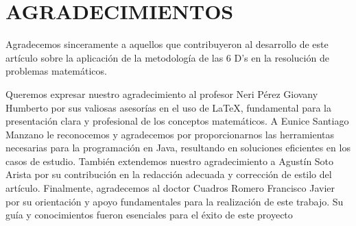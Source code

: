 \documentclass{IEEEcsmag}
\begin{document}
\section{AGRADECIMIENTOS}
Agradecemos sinceramente a aquellos que contribuyeron al desarrollo de este artículo sobre la aplicación de la metodología de las 6 D's en la resolución de problemas matemáticos.

Queremos expresar nuestro agradecimiento al profesor Neri Pérez Giovany Humberto por sus valiosas asesorías en el uso de LaTeX, fundamental para la presentación clara y profesional de los conceptos matemáticos. A Eunice Santiago Manzano le reconocemos y agradecemos por proporcionarnos las herramientas necesarias para la programación en Java, resultando en soluciones eficientes en los casos de estudio. También extendemos nuestro agradecimiento a Agustín Soto Arista por su contribución en la redacción adecuada y corrección de estilo del artículo. Finalmente, agradecemos al doctor Cuadros Romero Francisco Javier por su orientación y apoyo fundamentales para la realización de este trabajo. Su guía y conocimientos fueron esenciales para el éxito de este proyecto

\def\refname{REFERENCES}
\end{document}
